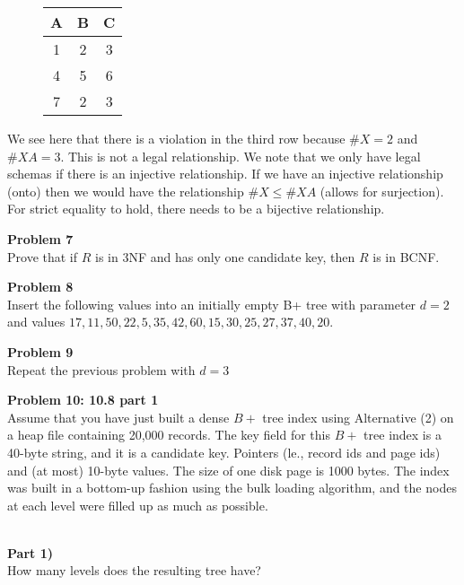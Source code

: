 \documentclass[12pt,letter]{article}
\newcommand{\problem}[1]{\vspace{3mm}\Large\textbf{{Problem
{#1}\vspace{3mm}}}\normalsize\\}
\newcommand{\ppart}[1]{\vspace{2mm}\large\textbf{\\Part
{#1})\vspace{2mm}}\normalsize\\}
\begin{document}
\FloatBarrier
\begin{figure}[ht]
    \center
\begin{tabular}{|c|c|c|}
    \hline
    A & B & C \\
    \hline
    1 & 2 & 3 \\
    \hline
    4 & 5 & 6 \\
    \hline
    7 & 2 & 3 \\
    \hline
\end{tabular}
\end{figure}
\FloatBarrier

We see here that there is a violation in the third row because $\#X = 2$ and
$\#XA = 3$. This is not a legal relationship.  We note that we only have legal
schemas if there is an injective relationship. If we have an injective
relationship (onto) then we would have the relationship $\#X \leq \#XA$ (allows
for surjection). For strict equality to hold, there needs to be a bijective
relationship.


\problem{7}
Prove that if $R$ is in 3NF and has only one candidate key, then $R$ is in BCNF.

\problem{8}
Insert the following values into an initially empty B+ tree with parameter $d=2$
and values $17, 11, 50, 22, 5, 35, 42, 60, 15, 30, 25, 27, 37, 40, 20$.

\problem{9}
Repeat the previous problem with $d=3$

\problem{10: 10.8 part 1}
Assume that you have just built a dense $B+$ tree index using Alternative (2) on
a heap file containing 20,000 records. The key field for this $B+$ tree index is
a 40-byte string, and it is a candidate key. Pointers (le., record ids and page
ids) and (at most) 10-byte values. The size of one disk page is 1000 bytes. The
index was built in a bottom-up fashion using the bulk loading algorithm, and the
nodes at each level were filled up as much as possible.

\ppart{1}
How many levels does the resulting tree have?
\end{document}
